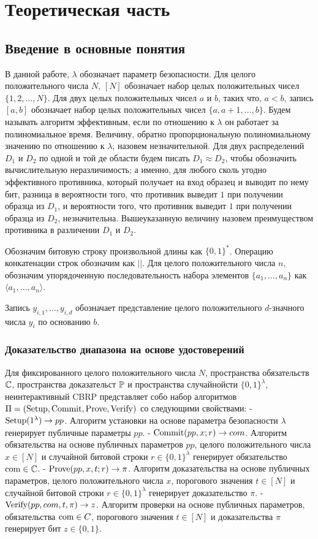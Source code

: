\chapter{Теоретическая часть}
\section{Введение в основные понятия} %
В данной работе, $\lambda$ обозначает параметр безопасности.
Для целого положительного числа $N$, $[N]$ обозначает набор целых положительных чисел $\{1, 2, \dots, N\}$.
Для двух целых положительных чисел $a$ и $b$, таких что, $a < b$, запись $[a, b]$ обозначает набор целых положительных чисел $\{a, a + 1, \dots, b\}$.
Будем называть алгоритм эффективным, если по отношению к $\lambda$ он работает за полиномиальное время.
Величину, обратно пропорциональную полиномиальному значению по отношению к $\lambda$, назовем незначительной.
Для двух распределений $D_1$ и $D_2$ по одной и той де области будем писать $D_1 \approx D_2$, чтобы обозначить вычислительную неразличимость; а именно, для любого сколь угодно эффективного противника, который получает на вход образец и выводит по нему бит, разница в вероятности того, что противник выведит $1$ при получении образца из $D_1$, и вероятности того, что противник выведит $1$ при получении образца из $D_2$, незначительна.
Вышеуказанную величину назовем преимуществом противника в различении $D_1$ и $D_2$.

Обозначим битовую строку произвольной длины как $\{0, 1\}^*$.
Операцию конкатенации строк обозначим как $||$.
Для целого положительного числа $n$, обозначим упорядоченную последовательность набора элементов $\{a_1, \dots, a_n\}$ как $\langle a_1, \dots, a_n \rangle$.

Запись $y_{i, 1}, \dots, y_{i, d}$ обозначает представление целого положительного $d$-значного числа $y_i$ по основанию $b$.

\subsection{Доказательство диапазона на основе удостоверений} %
Для фиксированного целого положительного числа $N$, пространства обязательств $\C$, пространства доказательст $\P$ и пространства случайнойсти $\{0, 1\}^\lambda$, неинтерактивный CBRP представляет собо набор алгоритмов $\Pi = (\Setup, \Commit, \Prove, \Verify)$ со следующими свойствами:
- $\Setup(1^\lambda) \rightarrow pp$. Алгоритм установки на основе параметра безопасности $\lambda$ генерирует публичные параметры $pp$.
- $\Commit(pp, x; r) \rightarrow com$. Алгоритм обязательства на основе публичных параметров $pp$, целого положительного числа $x \in [N]$ и случайной битовой строки $r \in \{0, 1\}^\lambda$ генерирует обязательство $\com \in \C$.
- $\Prove(pp, x, t; r) \rightarrow \pi$. Алгоритм доказательства на основе публичных параметров, целого положительного числа $x$, порогового значения $t \in [N]$ и случайной битовой строки $r \in \{0, 1\}^\lambda$ генерирует доказательство $\pi$.
- $\Verify(pp, com, t, \pi) \rightarrow z$. Алгоритм проверки на основе публичных параметров, обязательства $\com \in C$, порогового значения $t \in [N]$ и доказательства $\pi$ генерирует бит $z \in \{0, 1\}$.

